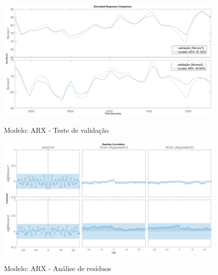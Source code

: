 \begin{apendicesenv}
\begin{figure}
	\caption{Modelo: ARX - Teste de validação}
	\begin{center}
		\includegraphics[width=1.00\textwidth]{./5_images/tclabsp-models-ARX-compare.png} 
		\label{fig:tclabsp-models-arx-compare}
	\end{center}
	\centering
\end{figure}

\begin{figure}
	\caption{Modelo: ARX - Análise de resíduos}
	\begin{center}
		\includegraphics[width=1.00\textwidth]{./5_images/tclabsp-models-ARX-resid.png} 
		\label{fig:tclabsp-models-arx-resid}
	\end{center}
	\centering
\end{figure}


\end{apendicesenv}
